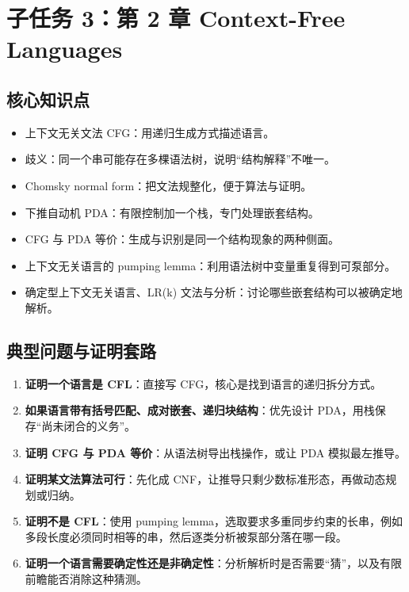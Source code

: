 \section{子任务 3：第 2 章 Context-Free Languages}

\subsection{核心知识点}

\begin{itemize}[leftmargin=2em]
  \item 上下文无关文法 CFG：用递归生成方式描述语言。
  \item 歧义：同一个串可能存在多棵语法树，说明“结构解释”不唯一。
  \item Chomsky normal form：把文法规整化，便于算法与证明。
  \item 下推自动机 PDA：有限控制加一个栈，专门处理嵌套结构。
  \item CFG 与 PDA 等价：生成与识别是同一个结构现象的两种侧面。
  \item 上下文无关语言的 pumping lemma：利用语法树中变量重复得到可泵部分。
  \item 确定型上下文无关语言、LR(k) 文法与分析：讨论哪些嵌套结构可以被确定地解析。
\end{itemize}

\subsection{典型问题与证明套路}

\begin{enumerate}[leftmargin=2em]
  \item \textbf{证明一个语言是 CFL}：直接写 CFG，核心是找到语言的递归拆分方式。
  \item \textbf{如果语言带有括号匹配、成对嵌套、递归块结构}：优先设计 PDA，用栈保存“尚未闭合的义务”。
  \item \textbf{证明 CFG 与 PDA 等价}：从语法树导出栈操作，或让 PDA 模拟最左推导。
  \item \textbf{证明某文法算法可行}：先化成 CNF，让推导只剩少数标准形态，再做动态规划或归纳。
  \item \textbf{证明不是 CFL}：使用 pumping lemma，选取要求多重同步约束的长串，例如多段长度必须同时相等的串，然后逐类分析被泵部分落在哪一段。
  \item \textbf{证明一个语言需要确定性还是非确定性}：分析解析时是否需要“猜”，以及有限前瞻能否消除这种猜测。
\end{enumerate}

